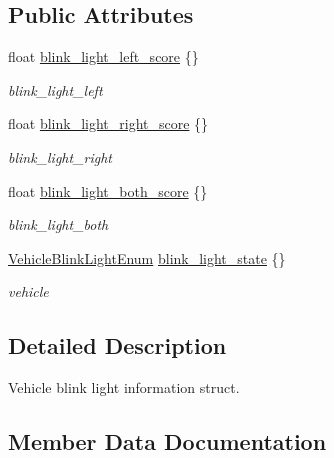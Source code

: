 \subsection*{Public Attributes}
\begin{DoxyCompactItemize}
\item 
float \hyperlink{structmaf__perception__interface_1_1VehicleBlinkLightInfo_aa3b8493a7db0a8737e8cd402328e4e69}{blink\+\_\+light\+\_\+left\+\_\+score} \{\}
\begin{DoxyCompactList}\small\item\em blink\+\_\+light\+\_\+left \end{DoxyCompactList}\item 
float \hyperlink{structmaf__perception__interface_1_1VehicleBlinkLightInfo_adfae0dd37ebbd71eb594e1b2f3e76e05}{blink\+\_\+light\+\_\+right\+\_\+score} \{\}
\begin{DoxyCompactList}\small\item\em blink\+\_\+light\+\_\+right \end{DoxyCompactList}\item 
float \hyperlink{structmaf__perception__interface_1_1VehicleBlinkLightInfo_a4cdf09f399d6c9079b77b6907955f11a}{blink\+\_\+light\+\_\+both\+\_\+score} \{\}
\begin{DoxyCompactList}\small\item\em blink\+\_\+light\+\_\+both \end{DoxyCompactList}\item 
\hyperlink{structmaf__perception__interface_1_1VehicleBlinkLightEnum}{Vehicle\+Blink\+Light\+Enum} \hyperlink{structmaf__perception__interface_1_1VehicleBlinkLightInfo_a4be6b0fb9f4e56097787ec79fb02ff72}{blink\+\_\+light\+\_\+state} \{\}
\begin{DoxyCompactList}\small\item\em vehicle \end{DoxyCompactList}\end{DoxyCompactItemize}


\subsection{Detailed Description}
Vehicle blink light information struct. 

\subsection{Member Data Documentation}
\mbox{\label{structmaf__perception__interface_1_1VehicleBlinkLightInfo_a4cdf09f399d6c9079b77b6907955f11a}} 
